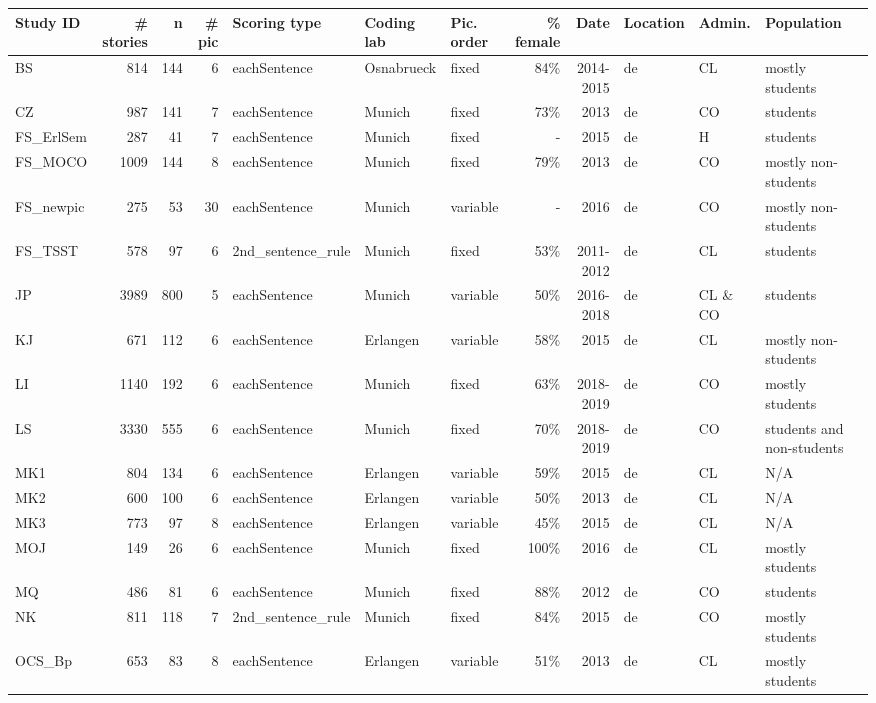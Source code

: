 \documentclass[man,a4paper,mask]{apa6}
\begin{document}
\begin{sidewaystable*}
\begin{threeparttable}
\begin{tabularx}{\textwidth}{lrrrlllrrllll}
Study ID & \# stories & n & \# pic & Scoring type & Coding lab & Pic. order & \% female & Date & Location & Admin. & Population \\ 
  \hline
BS & 814 & 144 &   6 & eachSentence & Osnabrueck & fixed & 84\% & 2014-2015 & de & CL & mostly students \\ 
  CZ & 987 & 141 &   7 & eachSentence & Munich & fixed & 73\% & 2013 & de & CO & students \\ 
  FS\_ErlSem & 287 &  41 &   7 & eachSentence & Munich & fixed & - & 2015 & de & H & students \\ 
  FS\_MOCO & 1009 & 144 &   8 & eachSentence & Munich & fixed & 79\% & 2013 & de & CO & mostly non-students \\ 
  FS\_newpic & 275 &  53 &  30 & eachSentence & Munich & variable & - & 2016 & de & CO & mostly non-students \\ 
  FS\_TSST & 578 &  97 &   6 & 2nd\_sentence\_rule & Munich & fixed & 53\% & 2011-2012 & de & CL & students \\ 
  JP & 3989 & 800 &   5 & eachSentence & Munich & variable & 50\% & 2016-2018 & de & CL \& CO & students \\ 
  KJ & 671 & 112 &   6 & eachSentence & Erlangen & variable & 58\% & 2015 & de & CL & mostly non-students \\ 
  LI & 1140 & 192 &   6 & eachSentence & Munich & fixed & 63\% & 2018-2019 & de & CO & mostly students \\ 
  LS & 3330 & 555 &   6 & eachSentence & Munich & fixed & 70\% & 2018-2019 & de & CO & students and non-students \\ 
  MK1 & 804 & 134 &   6 & eachSentence & Erlangen & variable & 59\% & 2015 & de & CL & N/A \\ 
  MK2 & 600 & 100 &   6 & eachSentence & Erlangen & variable & 50\% & 2013 & de & CL & N/A \\ 
  MK3 & 773 &  97 &   8 & eachSentence & Erlangen & variable & 45\% & 2015 & de & CL & N/A \\ 
  MOJ & 149 &  26 &   6 & eachSentence & Munich & fixed & 100\% & 2016 & de & CL & mostly students \\ 
  MQ & 486 &  81 &   6 & eachSentence & Munich & fixed & 88\% & 2012 & de & CO & students \\ 
  NK & 811 & 118 &   7 & 2nd\_sentence\_rule & Munich & fixed & 84\% & 2015 & de & CO & mostly students \\ 
  OCS\_Bp & 653 &  83 &   8 & eachSentence & Erlangen & variable & 51\% & 2013 & de & CL & mostly students \\ 

\end{tabularx}
\end{threeparttable}
\end{sidewaystable*}
\end{document}

